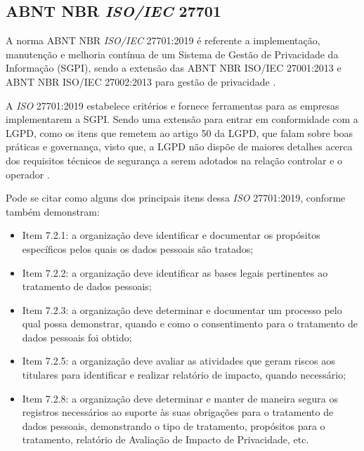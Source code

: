 \documentclass[
	12pt,				%
	openright,			%
	oneside,			%
	a4paper,			%
	english,			%
	french,				%
	spanish,			%
	brazil,				%
	]{abntex2}
\begin{document}
\subsection{ABNT NBR \textit{ISO/IEC} 27701 }

A norma ABNT NBR \textit{ISO/IEC} 27701:2019 é referente a implementação, manutenção e melhoria contínua de um Sistema de Gestão de Privacidade da Informação (SGPI), sendo a extensão das ABNT NBR ISO/IEC 27001:2013 e ABNT NBR ISO/IEC 27002:2013 para gestão de privacidade \cite{abnt}.

A \textit{ISO} 27701:2019 estabelece critérios e fornece ferramentas para as empresas implementarem a SGPI.  Sendo uma extensão para entrar em conformidade com a LGPD, como os itens que remetem ao artigo 50 da LGPD, que falam sobre boas práticas e governança, visto que, a LGPD não dispõe de maiores detalhes acerca dos requisitos técnicos de segurança a serem adotados na relação controlar e o operador \cite{lgpd1alves}. 

 Pode se citar como alguns dos principais itens dessa \textit{ISO} 27701:2019, conforme também \cite{Vainzof2020} demonstram:
\begin{itemize}
\item Item 7.2.1: a organização deve identificar e documentar os propósitos específicos pelos quais os dados pessoais são tratados;
\item Item 7.2.2: a organização deve identificar as bases legais pertinentes ao tratamento de dados pessoais;
\item Item 7.2.3: a organização deve determinar e documentar um processo pelo qual possa demonstrar, quando e como o consentimento para o  tratamento de dados pessoais foi obtido;
\item Item 7.2.5: a organização deve avaliar as atividades que geram riscos aos titulares para identificar e realizar relatório de impacto, quando necessário;
\item Item 7.2.8: a organização deve determinar e manter de maneira segura os registros necessários ao suporte às suas obrigações para o tratamento de dados pessoais, demonstrando o tipo de tratamento, propósitos para o tratamento, relatório de Avaliação de Impacto de Privacidade, etc.
\end{itemize}

\end{document}
